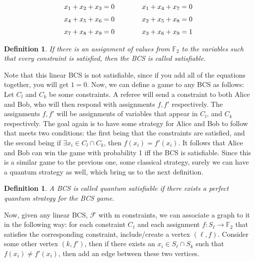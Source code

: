 \documentclass[12pt]{article}
\newtheorem{defn}[thm]{Definition}
\begin{document}
\begin{equation*}
\label{bcs}
\openup\jot %
\begin{aligned}[t]
x_1 + x_2 + x_3 &= 0 \\
x_4 + x_5 + x_6 &= 0 \\
x_7 + x_8 + x_9 &= 0
\end{aligned}
\qquad\qquad %
\begin{aligned}[t]
x_1 + x_4 + x_7 &= 0 \\
x_2 + x_5 + x_8 &= 0 \\
x_3 + x_6 + x_9 &= 1
\end{aligned}
\end{equation*}

\begin{defn}
If there is an assignment of values from $\mathbb{F}_2$ to the variables such that every constraint is satisfied, then the BCS is called satisfiable.
\end{defn}
Note that this linear BCS is not satisfiable, since if you add all of the equations together, you will get $1=0$. Now, we can define a game to any BCS as follows: Let $C_l$ and $C_k$ be some constraints. A referee will send a constraint to both Alice and Bob, who will then respond with assignments $f, f'$ respectively. The assignments $f, f'$ will be assignments of variables that appear in $C_l$, and $C_k$ respectively. The goal again is to have some strategy for Alice and Bob to follow that meets two conditions: the first being that the constraints are satisfied, and the second being if $\exists x_i \in C_l \cap C_k$, then $f(x_i) = f'(x_i)$. It follows that Alice and Bob can win the game with probability 1 iff the BCS is satisfiable. Since this is a similar game to the previous one, some classical strategy, surely we can have a quantum strategy as well, which bring us to the next definition.
\begin{defn}
A BCS is called quantum satisfiable if there exists a perfect quantum strategy for the BCS game.
\end{defn}

Now, given any linear BCS, $\mathcal{F}$ with m constraints, we can associate a graph to it in the following way: for each constraint $C_{\ell}$ and each assignment $f:S_{\ell} \rightarrow \mathbb{F}_2$ that satisfies the corresponding constraint, include/create a vertex $(\ell, f)$. Consider some other vertex $(k, f')$, then if there exists an $x_i \in S_{\ell} \cap S_{k}$ such that $f(x_i) \neq  f'(x_i)$, then add an edge between these two vertices.
\end{document}
